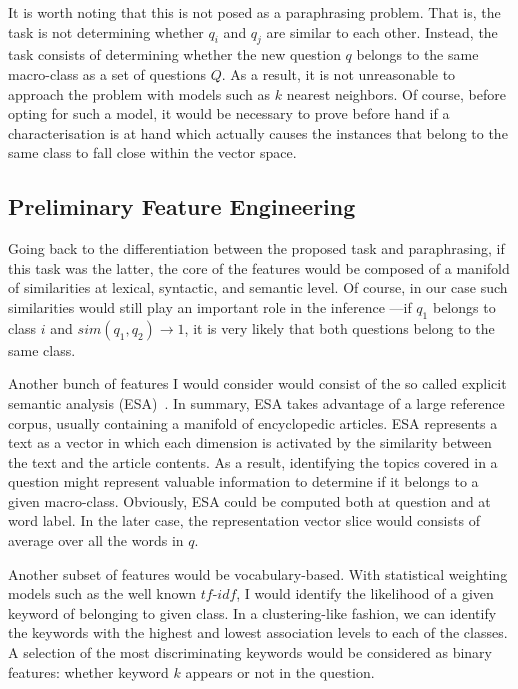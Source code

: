 \documentclass{sig-alternate-05-2015}
\begin{document}
It is worth noting that this is not posed as a paraphrasing problem. That is, 
the task is not determining whether $q_i$ and $q_j$ are similar to each other. 
Instead, the task consists of determining whether the new question $q$ belongs 
to the same macro-class as a set of questions $Q$. As a result, it is not 
unreasonable to approach the problem with models such as $k$ nearest neighbors. 
Of course, before opting for such a model, it would be necessary to prove before 
hand if a characterisation is at hand which actually causes the instances that 
belong to the same class to fall close within the vector space. 

\subsection{Preliminary Feature Engineering}

Going back to the differentiation between the proposed task and paraphrasing, 
if this task was the latter, the core of the features would be composed of a 
manifold of similarities at lexical, syntactic, and semantic level. Of course, 
in our case such similarities would still play an important role in the 
inference ---if $q_1$ belongs to class $i$ and $sim(q_1,q_2)\rightarrow 1$, it 
is very likely that both questions belong to the same class. 

Another bunch of features I would consider would consist of the so called 
explicit semantic analysis (ESA)~\cite{Gabrilovich:07}. In summary, 
ESA takes advantage of a large reference corpus, usually containing a manifold 
of encyclopedic articles. ESA represents a text as a vector in which each 
dimension is activated by the similarity between the text and the article 
contents. As a result, identifying the topics covered in a question might 
represent valuable information to determine if it belongs to a given 
macro-class. Obviously, ESA could be computed both at question and at word 
label. In the later case, the representation vector slice would consists of 
average over all the words in $q$.

Another subset of features would be vocabulary-based. With statistical weighting 
models such as the well known $tf$-$idf$, I would identify the likelihood of a 
given keyword of belonging to given class. In a clustering-like fashion, we can 
identify the keywords with the highest and lowest association levels to each of 
the classes. A selection of the most discriminating keywords would be considered 
as binary features: whether keyword $k$ appears or not in the question. 
\end{document}
